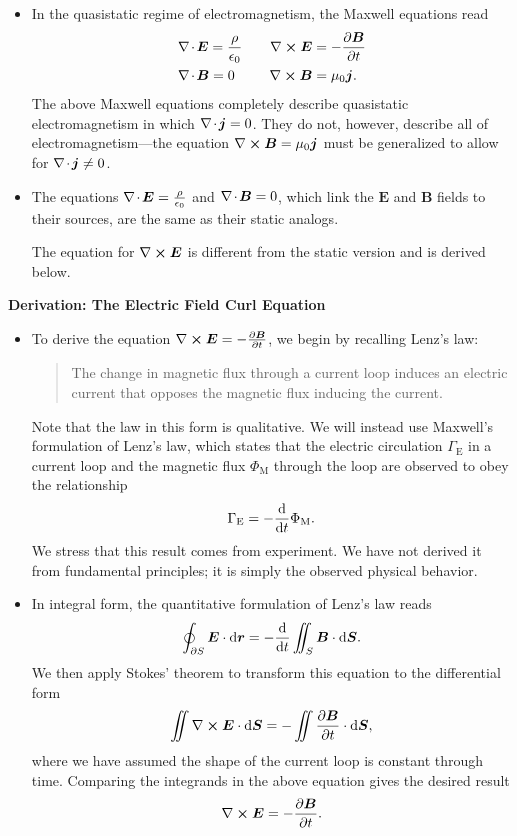 \documentclass[11pt, a4paper]{article}
\newcommand{\diff}{\mathop{}\!\mathrm{d}} %
\renewcommand{\vec}[1]{\bm{#1}} %
\renewcommand{\r}{\vec{r}}
\newcommand{\E}{\vec{E}} %
\newcommand{\B}{\vec{B}} %
\newcommand{\ee}{\epsilon_{0}}  %
\newcommand{\mm}{\mu_{0}}  %
\renewcommand{\j}{\vec{j}}  %
\renewcommand{\div}{\nabla \mspace{-2mu} \cdot \mspace{-2mu}}
\renewcommand{\curl}{\nabla \cross}
\begin{document}
\begin{itemize}
    \item In the quasistatic regime of electromagnetism, the Maxwell equations read
	\begin{align*}
		&\div \E = \frac{\rho}{\ee} \qquad \curl \E = - \pdv{\B}{t}\\
		& \div \B = 0 \ \, \qquad \curl \B = \mm \j.
	\end{align*}
    The above Maxwell equations completely describe quasistatic electromagnetism in which $ \div \j = 0 $. They do not, however, describe all of electromagnetism---the equation $ \curl \B = \mm \j  $ must be generalized to allow for $ \div \j \neq 0 $.
    
    \item The equations $ \div \E = \frac{\rho}{\ee} $ and $ \div \B  = 0 $, which link the $ \E $ and $ \B $ fields to their sources, are the same as their static analogs.

    The equation for $ \curl \E $ is different from the static version and is derived below.

\end{itemize}

\textbf{Derivation: The Electric Field Curl Equation}
\begin{itemize}
    \item To derive the equation $ \curl \E = - \pdv{\B}{t} $, we begin by recalling Lenz's law:
    \begin{quote}
        The change in magnetic flux through a current loop induces an electric current that opposes the magnetic flux inducing the current. 
    \end{quote}
	Note that the law in this form is qualitative. We will instead use Maxwell's formulation of Lenz's law, which states that the electric circulation $ \Gamma_{\mathrm{E}} $ in a current loop and the magnetic flux $ \Phi_{\text{M}} $ through the loop are observed to obey the relationship
	\begin{equation*}
		\Gamma_{\mathrm{E}} = -\dv{t} \Phi_{\text{M}}.
	\end{equation*}
    We stress that this result comes from experiment. We have not derived it from fundamental principles; it is simply the observed physical behavior.
	
	\item In integral form, the quantitative formulation of Lenz's law reads
	\begin{equation*}
		\oint_{\partial S}\E \cdot \diff \r = - \dv{t} \iint_{S} \B \cdot \diff \vec{S}.
	\end{equation*}
	We then apply Stokes' theorem to transform this equation to the differential form
	\begin{equation*}
		\iint \curl \E \cdot \diff \vec{S} = - \iint \pdv{\B}{t} \cdot \diff \vec{S},
	\end{equation*}
    where we have assumed the shape of the current loop is constant through time. Comparing the integrands in the above equation gives the desired result
	\begin{equation*}
		\curl \E = - \pdv{\B}{t}.
	\end{equation*}
	
\end{itemize}
\end{document}
